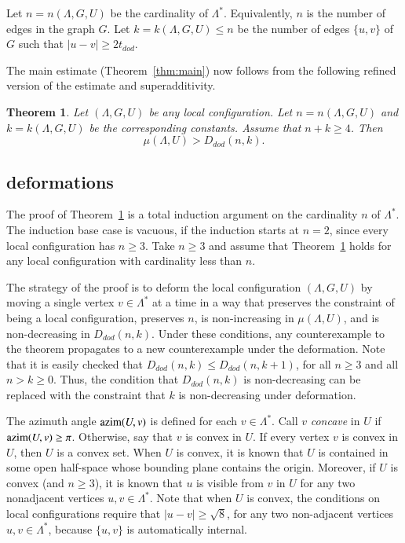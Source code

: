 \documentclass{article} %
\newtheorem{theorem}{Theorem}[section]
\begin{document}

Let $n=n(\Lambda,G,U)$ be the cardinality of $\Lambda^*$.  Equivalently,
$n$ is the number of edges in the graph $G$.  Let
$k=k(\Lambda,G,U)\le n$ be the number of edges $\{u,v\}$ of $G$ such
that $|u-v|\ge 2t_{dod}$. 

The main estimate (Theorem~\ref{thm:main}) now follows from the following
refined version of the estimate and superadditivity.

\begin{theorem}\label{thm:main'}  
Let $(\Lambda,G,U)$ be any local configuration.
Let $n=n(\Lambda,G,U)$ and $k=k(\Lambda,G,U)$ be the corresponding constants.
Assume that $n+k\ge 4$.  Then
   $$
   \mu(\Lambda,U) > D_{dod}(n,k).
   $$
\end{theorem}

\subsection{deformations}


The proof of Theorem~\ref{thm:main'} is a total induction argument
on  the cardinality $n$ of $\Lambda^*$.  The induction base case
is vacuous, if the induction starts at $n=2$, since every
local configuration has $n\ge 3$.
Take $n\ge 3$ and assume that
Theorem~\ref{thm:main'} holds for any local configuration with
cardinality less than $n$.  

The strategy of the proof is to deform the local configuration $(\Lambda,G,U)$ by moving a single vertex $v\in\Lambda^*$ at a time in a way
that preserves the constraint of being a local configuration,
preserves $n$, 
is non-increasing in $\mu(\Lambda,U)$, 
and is non-decreasing in $D_{dod}(n,k)$.
Under these conditions, any counterexample to the theorem propagates 
to a new counterexample under the deformation.
Note that it is easily checked that $D_{dod}(n,k) \le D_{dod}(n,k+1)$, for all
$n\ge 3$ and all $n> k\ge0$.  Thus, the condition that $D_{dod}(n,k)$
is non-decreasing can be replaced with the constraint that $k$
is non-decreasing under deformation.

The azimuth angle
${\operatorname{azim}}(U,v)$ is defined for each $v\in\Lambda^*$.  
Call $v$ {\it concave} in $U$
if ${\operatorname{azim}}(U,v)\ge\pi$.  Otherwise, say that $v$ is convex
in $U$.  If every vertex $v$ is convex in $U$, then $U$
is a convex set.  When $U$ is convex, it is known that $U$
is contained in some open half-space whose bounding plane
contains the origin.  Moreover,
if $U$ is convex (and $n\ge 3$),
it is known that $u$ is visible from $v$ in $U$
for any two nonadjacent vertices $u,v\in\Lambda^*$.  Note that when $U$ is 
convex, the conditions on local configurations require that
$|u-v|\ge\sqrt8$, for any two non-adjacent vertices $u,v\in\Lambda^*$,
because $\{u,v\}$ is automatically internal.
\end{document}
